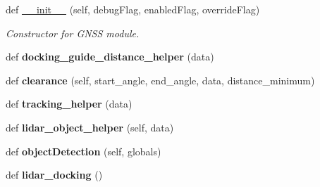 \begin{DoxyCompactItemize}
\item 
def \hyperlink{classmcs_1_1firmware_1_1rpLiDAR__A2M4__R4__backup_1_1rpLiDAR__A2M4__R4_a8ce3acc804d5aa1d223529b1ef31fe0f}{\+\_\+\+\_\+init\+\_\+\+\_\+} (self, debug\+Flag, enabled\+Flag, override\+Flag)
\begin{DoxyCompactList}\small\item\em Constructor for G\+N\+SS module. \end{DoxyCompactList}\item 
\mbox{\label{classmcs_1_1firmware_1_1rpLiDAR__A2M4__R4__backup_1_1rpLiDAR__A2M4__R4_ad60e8f217b93fbb742e497473d9ab9c2}} 
def {\bfseries docking\+\_\+guide\+\_\+distance\+\_\+helper} (data)
\item 
\mbox{\label{classmcs_1_1firmware_1_1rpLiDAR__A2M4__R4__backup_1_1rpLiDAR__A2M4__R4_ac730d67f191e73d14ffd6925094c33da}} 
def {\bfseries clearance} (self, start\+\_\+angle, end\+\_\+angle, data, distance\+\_\+minimum)
\item 
\mbox{\label{classmcs_1_1firmware_1_1rpLiDAR__A2M4__R4__backup_1_1rpLiDAR__A2M4__R4_a568a0776e767302a0ba513658aa8135e}} 
def {\bfseries tracking\+\_\+helper} (data)
\item 
\mbox{\label{classmcs_1_1firmware_1_1rpLiDAR__A2M4__R4__backup_1_1rpLiDAR__A2M4__R4_a4163610940c24550d62c43684688e5b2}} 
def {\bfseries lidar\+\_\+object\+\_\+helper} (self, data)
\item 
\mbox{\label{classmcs_1_1firmware_1_1rpLiDAR__A2M4__R4__backup_1_1rpLiDAR__A2M4__R4_a3d35db865a54a54ccac04b73857a041d}} 
def {\bfseries object\+Detection} (self, globals)
\item 
\mbox{\label{classmcs_1_1firmware_1_1rpLiDAR__A2M4__R4__backup_1_1rpLiDAR__A2M4__R4_a1518c4335c48800996e0f4ea30845889}} 
def {\bfseries lidar\+\_\+docking} ()
\end{DoxyCompactItemize}
